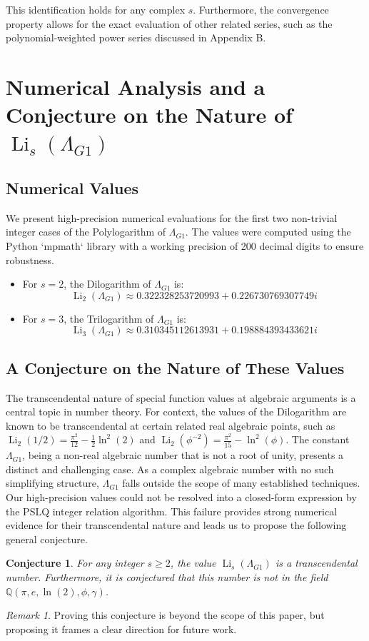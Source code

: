 \documentclass{amsart}
\theoremstyle{plain}
\newtheorem{conjecture}[theorem]{Conjecture}
\theoremstyle{definition}
\theoremstyle{remark}
\newtheorem*{remark}{Remark}
\DeclareMathOperator{\Li}{Li} %
\newcommand{\LambdaG}{\Lambda_{G1}}
\begin{document}
This identification holds for any complex $s$. Furthermore, the convergence property allows for the exact evaluation of other related series, such as the polynomial-weighted power series discussed in Appendix B.

\section{Numerical Analysis and a Conjecture on the Nature of \texorpdfstring{$\Li_s(\LambdaG)$}{Li\_s(Lambda\_G1)}}

\subsection{Numerical Values}
We present high-precision numerical evaluations for the first two non-trivial integer cases of the Polylogarithm of $\LambdaG$.
The values were computed using the Python `mpmath` library with a working precision of 200 decimal digits to ensure robustness.
\begin{itemize}
    \item For $s=2$, the Dilogarithm of $\LambdaG$ is:
    $$ \Li_2(\LambdaG) \approx 0.322328253720993 + 0.226730769307749i $$
    
    \item For $s=3$, the Trilogarithm of $\LambdaG$ is:
    $$ \Li_3(\LambdaG) \approx 0.310345112613931 + 0.198884393433621i $$
    
\end{itemize}

\subsection{A Conjecture on the Nature of These Values}
The transcendental nature of special function values at algebraic arguments is a central topic in number theory.
For context, the values of the Dilogarithm are known to be transcendental at certain related real algebraic points, such as $\Li_2(1/2) = \frac{\pi^2}{12} - \frac{1}{2}\ln^2(2)$ and $\Li_2(\phi^{-2}) = \frac{\pi^2}{15} - \ln^2(\phi)$.
The constant $\LambdaG$, being a non-real algebraic number that is not a root of unity, presents a distinct and challenging case.
As a complex algebraic number with no such simplifying structure, $\LambdaG$ falls outside the scope of many established techniques.
Our high-precision values could not be resolved into a closed-form expression by the PSLQ integer relation algorithm.
This failure provides strong numerical evidence for their transcendental nature and leads us to propose the following general conjecture.
\begin{conjecture}
For any integer $s \ge 2$, the value $\Li_s(\LambdaG)$ is a transcendental number.
Furthermore, it is conjectured that this number is not in the field $\mathbb{Q}(\pi, e, \ln(2), \phi, \gamma)$.
\end{conjecture}
\begin{remark}
Proving this conjecture is beyond the scope of this paper, but proposing it frames a clear direction for future work.
\end{remark}
\end{document}
